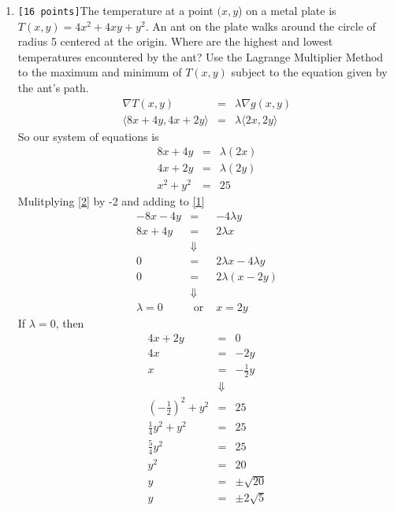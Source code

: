 \documentclass[10pt]{article}
\begin{document}
\begin{enumerate}
\item \verb![16 points]!The temperature at a point $(x, y$) on a metal plate is $T(x, y) = 4x^2 + 4xy +y^2$. An ant on the plate walks
    around the circle of radius 5 centered at the origin. Where are the highest and lowest temperatures encountered by
    the ant? Use the Lagrange Multiplier Method to the maximum and minimum of $T(x, y)$ subject to the equation
    given by the ant's path.
    \begin{eqnarray*}
        \nabla T(x,y)
        & = & \lambda \nabla g(x,y) \\
        \langle 8x + 4y,4x + 2y \rangle
        & = & \lambda \langle 2x,2y \rangle
    \end{eqnarray*}
    So our system of equations is
    \begin{eqnarray}
        8x + 4y
        & = & \lambda(2x)\label{1} \\
        4x + 2y
        & = & \lambda(2y)\label{2} \\
        x^2 + y^2
        & = & 25\label{3}
    \end{eqnarray}
    Mulitplying \ref{2} by -2 and adding to \ref{1}
    \begin{eqnarray*}
        -8x - 4y & = & -4\lambda y \\
        8x + 4y & = & 2\lambda x \\
        & \Downarrow &\\
        0 & = & 2\lambda x - 4\lambda y \\
        0 & = & 2\lambda(x - 2y) \\
        & \Downarrow & \\
        \lambda = 0 &\text{ or }& x = 2y
    \end{eqnarray*}
    If $\lambda = 0$, then
    \begin{eqnarray*}
        4x + 2y & = & 0 \\
        4x & = & -2y \\
        x & = & -\frac{1}{2}y \\
        & \Downarrow & \\
        \left(-\frac{1}{2}\right)^2 + y^2 & = & 25 \\
        \frac{1}{4}y^2 + y^2 & = & 25 \\
        \frac{5}{4}y^2 & = & 25 \\
        y^2 & = & 20 \\
        y & = & \pm\sqrt{20} \\
        y & = & \pm2\sqrt{5}
    \end{eqnarray*}

\end{enumerate}
\end{document}
